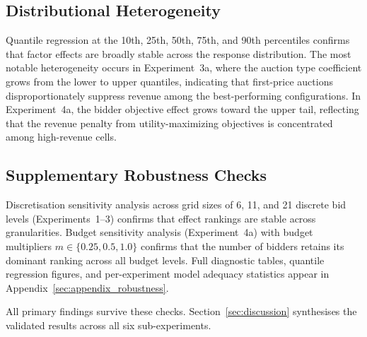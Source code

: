 \subsection{Distributional Heterogeneity}

Quantile regression at the 10th, 25th, 50th, 75th, and 90th percentiles confirms that factor effects are broadly stable across the response distribution. The most notable heterogeneity occurs in Experiment~3a, where the auction type coefficient grows from the lower to upper quantiles, indicating that first-price auctions disproportionately suppress revenue among the best-performing configurations. In Experiment~4a, the bidder objective effect grows toward the upper tail, reflecting that the revenue penalty from utility-maximizing objectives is concentrated among high-revenue cells.

\subsection{Supplementary Robustness Checks}

Discretisation sensitivity analysis across grid sizes of 6, 11, and 21 discrete bid levels (Experiments~1--3) confirms that effect rankings are stable across granularities. Budget sensitivity analysis (Experiment~4a) with budget multipliers $m \in \{0.25, 0.5, 1.0\}$ confirms that the number of bidders retains its dominant ranking across all budget levels. Full diagnostic tables, quantile regression figures, and per-experiment model adequacy statistics appear in Appendix~\ref{sec:appendix_robustness}.

All primary findings survive these checks. Section~\ref{sec:discussion} synthesises the validated results across all six sub-experiments.
